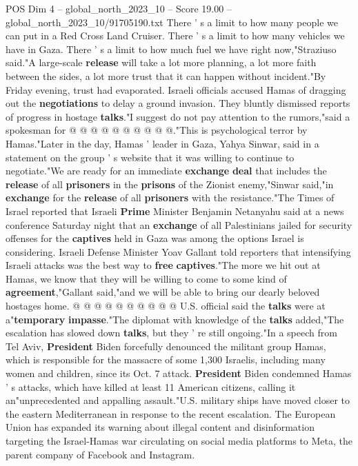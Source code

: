 \begin{textsample}{POS Dim 4 – global\_north\_2023\_10 – Score 19.00 – global\_north\_2023\_10/91705190.txt}
There ' s a limit to how many people we can put in a Red Cross Land Cruiser.
There ' s a limit to how many vehicles we have in Gaza.
There ' s a limit to how much fuel we have right now,"Straziuso said."A large-scale \textbf{release} will take a lot more planning, a lot more faith between the sides, a lot more trust that it can happen without incident."By Friday evening, trust had evaporated.
Israeli officials accused Hamas of dragging out the \textbf{negotiations} to delay a ground invasion.
They bluntly dismissed reports of progress in hostage \textbf{talks}."I suggest do not pay attention to the rumors,"said a spokesman for @ @ @ @ @ @ @ @ @ @."This is psychological terror by Hamas."Later in the day, Hamas ' leader in Gaza, Yahya Sinwar, said in a statement on the group ' s website that it was willing to continue to negotiate."We are ready for an immediate \textbf{exchange} \textbf{deal} that includes the \textbf{release} of all \textbf{prisoners} in the \textbf{prisons} of the Zionist enemy,"Sinwar said,"in \textbf{exchange} for the \textbf{release} of all \textbf{prisoners} with the resistance."The Times of Israel reported that Israeli \textbf{Prime} Minister Benjamin Netanyahu said at a news conference Saturday night that an \textbf{exchange} of all Palestinians jailed for security offenses for the \textbf{captives} held in Gaza was among the options Israel is considering.
Israeli Defense Minister Yoav Gallant told reporters that intensifying Israeli attacks was the best way to \textbf{free} \textbf{captives}."The more we hit out at Hamas, we know that they will be willing to come to some kind of \textbf{agreement},"Gallant said,"and we will be able to bring our dearly beloved hostages home. @ @ @ @ @ @ @ @ @ @ U.S. official said the \textbf{talks} were at a"\textbf{temporary} \textbf{impasse}."The diplomat with knowledge of the \textbf{talks} added,"The escalation has slowed down \textbf{talks}, but they ' re still ongoing."In a speech from Tel Aviv, \textbf{President} Biden forcefully denounced the militant group Hamas, which is responsible for the massacre of some 1,300 Israelis, including many women and children, since its Oct. 7 attack. \textbf{President} Biden condemned Hamas ' s attacks, which have killed at least 11 American citizens, calling it an"unprecedented and appalling assault."U.S. military ships have moved closer to the eastern Mediterranean in response to the recent escalation.
The European Union has expanded its warning about illegal content and disinformation targeting the Israel-Hamas war circulating on social media platforms to Meta, the parent company of Facebook and Instagram.

\end{textsample}
